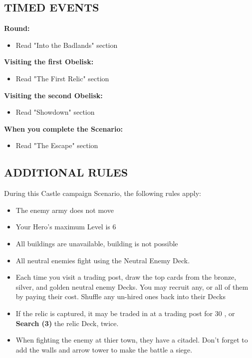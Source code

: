 \begin{multicols}{2}

\subsection*{\MakeUppercase{Timed Events}}

\textbf{ Round:}
\begin{itemize}
  \item Read "Into the Badlands" section
\end{itemize}

\textbf{Visiting the first Obelisk:}
\begin{itemize}
  \item Read "The First Relic" section
\end{itemize}

\textbf{Visiting the second Obelisk:}
\begin{itemize}
  \item Read "Showdown" section
\end{itemize}

\textbf{When you complete the Scenario:}
\begin{itemize}
  \item Read "The Escape" section
\end{itemize}



\subsection*{\MakeUppercase{Additional rules}}

During this Castle campaign Scenario, the following rules apply:

\begin{itemize}
  \item The enemy army does not move
  \item Your Hero's maximum Level is 6
  \item All buildings are unavailable, building is not possible
\end{itemize}

\columnbreak

\begin{itemize}
\item All neutral enemies fight using the Neutral Enemy Deck.
\item Each time you visit a trading post, draw the top cards from the  bronze,  silver, and  golden neutral enemy Decks. You may recruit any, or all of them by paying their cost. Shuffle any un-hired ones back into their Decks
\item If the relic is captured, it may be traded in at a trading post for 30 , or \textbf{Search (3)} the relic Deck, twice.
\item When fighting the enemy at thier town, they have a citadel. Don't forget to add the walls and arrow tower to make the battle a siege.
\end{itemize}

\end{multicols}

